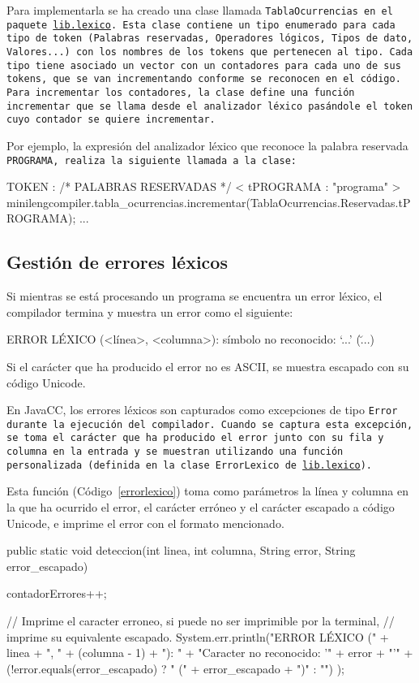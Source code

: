 Para implementarla se ha creado una clase llamada \tt{TablaOcurrencias} en el paquete \url{lib.lexico}. Esta clase contiene un tipo enumerado para cada tipo de token (Palabras reservadas, Operadores lógicos, Tipos de dato, Valores...) con los nombres de los tokens que pertenecen al tipo. Cada tipo tiene asociado un vector con un contadores para cada uno de sus tokens, que se van incrementando conforme se reconocen en el código. Para incrementar los contadores, la clase define una función \tt{incrementar} que se llama desde el analizador léxico pasándole el token cuyo contador se quiere incrementar.

Por ejemplo, la expresión del analizador léxico que reconoce la palabra reservada \tt{PROGRAMA}, realiza la siguiente llamada a la clase:

\begin{codigo}
TOKEN : /* PALABRAS RESERVADAS */
{
  < tPROGRAMA : "programa" >
  {
    minilengcompiler.tabla_ocurrencias.incrementar(TablaOcurrencias.Reservadas.tPROGRAMA);
  }
  ...
}
\end{codigo}

\subsection{Gestión de errores léxicos}
Si mientras se está procesando un programa se encuentra un error léxico, el compilador termina y muestra un error como el siguiente:

\begin{codigo}
ERROR LÉXICO (<línea>, <columna>): símbolo no reconocido: `...' (\u...)
\end{codigo}

Si el carácter que ha producido el error no es ASCII, se muestra escapado con su código Unicode.

En JavaCC, los errores léxicos son capturados como excepciones de tipo \tt{Error} durante la ejecución del compilador. Cuando se captura esta excepción, se toma el carácter que ha producido el error junto con su fila y columna en la entrada y se muestran utilizando una función personalizada (definida en la clase \tt{ErrorLexico} de \url{lib.lexico}).

Esta función (Código~\ref{errorlexico}) toma como parámetros la línea y columna en la que ha ocurrido el error, el carácter erróneo y el carácter escapado a código Unicode, e imprime el error con el formato mencionado.

\begin{codigo}[style=java, keywordstyle=\color{blue}, stringstyle=\color{red},
    caption={Función \tt{ErrorLexico.deteccion}.},
    label={errorlexico}]

public static void deteccion(int linea, int columna, String error, String error_escapado) {
    contadorErrores++;

    // Imprime el caracter erroneo, si puede no ser imprimible por la terminal,
    // imprime su equivalente escapado.
    System.err.println("ERROR LÉXICO (" + linea +
        ", " + (columna - 1) + "): " +
        "Caracter no reconocido: '" + error + "'" +
        (!error.equals(error_escapado) ? " (" + error_escapado + ")" : "")
    );
}
\end{codigo}
